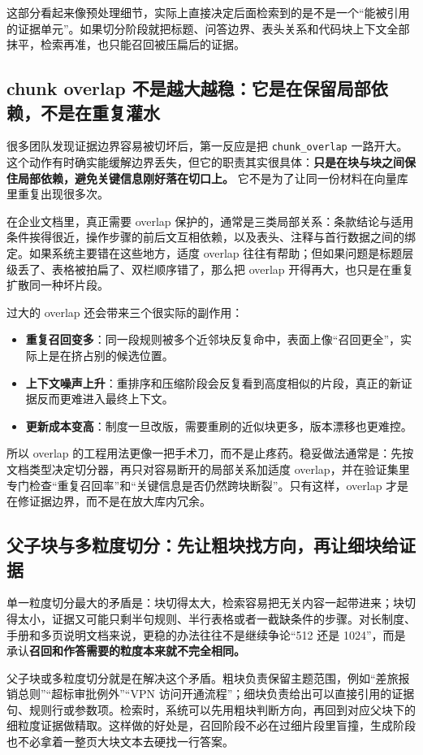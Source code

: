 这部分看起来像预处理细节，实际上直接决定后面检索到的是不是一个“能被引用的证据单元”。如果切分阶段就把标题、问答边界、表头关系和代码块上下文全部抹平，检索再准，也只能召回被压扁后的证据。

\subsection{chunk overlap 不是越大越稳：它是在保留局部依赖，不是在重复灌水}
很多团队发现证据边界容易被切坏后，第一反应是把 \texttt{chunk\_overlap} 一路开大。这个动作有时确实能缓解边界丢失，但它的职责其实很具体：\textbf{只是在块与块之间保住局部依赖，避免关键信息刚好落在切口上。} 它不是为了让同一份材料在向量库里重复出现很多次。

在企业文档里，真正需要 overlap 保护的，通常是三类局部关系：条款结论与适用条件挨得很近，操作步骤的前后文互相依赖，以及表头、注释与首行数据之间的绑定。如果系统主要错在这些地方，适度 overlap 往往有帮助；但如果问题是标题层级丢了、表格被拍扁了、双栏顺序错了，那么把 overlap 开得再大，也只是在重复扩散同一种坏片段。

过大的 overlap 还会带来三个很实际的副作用：
\begin{itemize}
  \item \textbf{重复召回变多}：同一段规则被多个近邻块反复命中，表面上像“召回更全”，实际上是在挤占别的候选位置。
  \item \textbf{上下文噪声上升}：重排序和压缩阶段会反复看到高度相似的片段，真正的新证据反而更难进入最终上下文。
  \item \textbf{更新成本变高}：制度一旦改版，需要重刷的近似块更多，版本漂移也更难控。
\end{itemize}

所以 overlap 的工程用法更像一把手术刀，而不是止疼药。稳妥做法通常是：先按文档类型决定切分器，再只对容易断开的局部关系加适度 overlap，并在验证集里专门检查“重复召回率”和“关键信息是否仍然跨块断裂”。只有这样，overlap 才是在修证据边界，而不是在放大库内冗余。

\subsection{父子块与多粒度切分：先让粗块找方向，再让细块给证据}
单一粒度切分最大的矛盾是：块切得太大，检索容易把无关内容一起带进来；块切得太小，证据又可能只剩半句规则、半行表格或者一截缺条件的步骤。对长制度、手册和多页说明文档来说，更稳的办法往往不是继续争论“512 还是 1024”，而是承认\textbf{召回和作答需要的粒度本来就不完全相同。}

父子块或多粒度切分就是在解决这个矛盾。粗块负责保留主题范围，例如“差旅报销总则”“超标审批例外”“VPN 访问开通流程”；细块负责给出可以直接引用的证据句、规则行或参数项。检索时，系统可以先用粗块判断方向，再回到对应父块下的细粒度证据做精取。这样做的好处是，召回阶段不必在过细片段里盲撞，生成阶段也不必拿着一整页大块文本去硬找一行答案。

